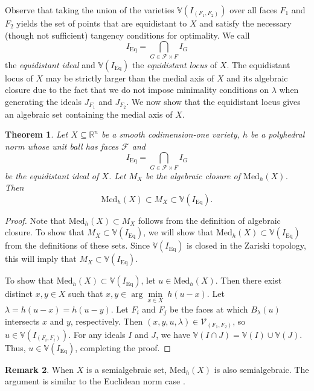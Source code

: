 \documentclass{article}
\newtheorem{theorem}{Theorem}
\numberwithin{theorem}{section}
\theoremstyle{definition}
\newtheorem{remark}[theorem]{Remark}
\theoremstyle{example_contd}
\newcommand{\F}{\mathcal{F}}
\newcommand{\RR}{\mathbb{R}}
\newcommand{\med}{\mathrm{Med}_h}
\newcommand{\V}{{\mathbb{V}}}
\begin{document}
Observe that taking the union of the varieties $\V(I_{(F_1,F_2)})$ over all faces $F_1$ and $F_2$ yields the set of points that are equidistant to $X$ and satisfy the necessary (though not sufficient) tangency conditions for optimality. We call 
\[ I_{\text{Eq}} = \bigcap_{G\in \F \times F}I_{G} \]
the \emph{equidistant ideal} and $\V(I_{\text{Eq}})$ the \emph{equidistant locus} of $X$.
The equidistant locus of $X$ may be strictly larger than the medial axis of $X$ and its algebraic closure due to the fact that we do not impose minimality conditions on $\lambda$ when generating the ideals $J_{F_1}$ and $J_{F_2}$. We now show that the equidistant locus gives an algebraic set containing the medial axis of $X$.


\begin{theorem}\label{thm:medialaxis}
	Let $X \subseteq \RR^n$ be a smooth codimension-one variety, $h$ be a polyhedral norm whose unit ball has 
    faces $\F$ and 
    \[ I_{\mathrm{Eq}} = \bigcap_{G\in \F \times F}I_{G}\]
    be the equidistant ideal of $X$. Let $M_X$ be the algebraic closure of $\med(X)$. Then
	\[\med(X) \subset M_X\subset \mathbb{V} \left(I_{\mathrm{Eq}} \right).\]
\end{theorem}

\begin{proof}
 Note that $\med(X) \subset M_X$ follows from the definition of algebraic closure. 
To show that $M_X \subset \mathbb{V}\left(I_{\mathrm{Eq}}\right)$, we will show that $\med(X) \subset \mathbb{V}\left(I_{\mathrm{Eq}}\right)$ from the definitions of these sets. 
 Since $\mathbb{V}\left(I_{\mathrm{Eq}}\right)$ is closed in the Zariski topology, this will imply that 
$M_X\subset \mathbb{V}\left(I_{\mathrm{Eq}}\right) $. 

To show that $\med(X) \subset \mathbb{V}\left(I_{\mathrm{Eq}}\right)$, let $u \in \med(X)$. Then there exist distinct $x,y \in X$ such that  $ x,y \in \arg\min\limits_{x\in X} \ h(u-x)$. Let $\lambda= h(u-x)=h(u-y)$. Let $F_{i}$ and $F_{j}$ be the faces at which $B_{\lambda}(u)$ intersects $x$ and $y$, respectively. 
Then $(x, y, u, \lambda) \in \mathcal{V}_{(F_1,F_2)}$, so $u \in \mathbb{V} (I_{(F_i, F_i)})$. For any ideals $I$ and $J$, we have $\mathbb{V}( I \cap J)= \V(I) \cup \V(J)$. Thus, $u \in \mathbb{V}\left(I_{\mathrm{Eq}}\right)$, completing the proof. 
\end{proof}

\begin{remark}
	When $X$ is a semialgebraic set, $\med(X)$ is also semialgebraic. The argument is similar to the Euclidean norm case \cite[Proposition 7.1]{breiding2024metric}.
\end{remark}
\end{document}
